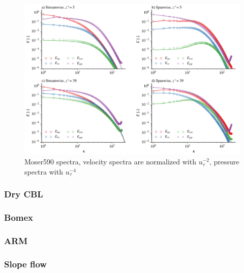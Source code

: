 \documentclass[gmd]{copernicus}
\begin{document}
\begin{figure}[t]
\vspace*{2mm}
\begin{center}
\includegraphics[width=16.6cm]{figs/gmd_m590_spectra.pdf}
\end{center}
\caption{Moser590 spectra, velocity spectra are normalized with $u_\tau^{-2}$, pressure spectra with $u_\tau^{-4}$}
\end{figure}

\subsubsection{Dry CBL}
\subsubsection{Bomex}
\subsubsection{ARM}
\subsubsection{Slope flow}

\conclusions  %



\end{document}

